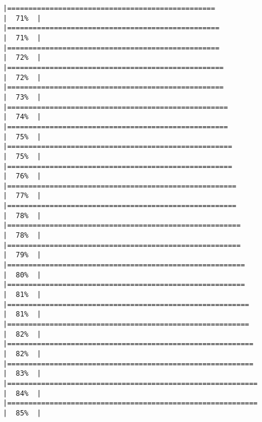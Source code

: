 \documentclass[
]{article}
\begin{document}
\begin{verbatim}
|=================================================                     |  71%  |                                                                              |==================================================                    |  71%  |                                                                              |==================================================                    |  72%  |                                                                              |===================================================                   |  72%  |                                                                              |===================================================                   |  73%  |                                                                              |====================================================                  |  74%  |                                                                              |====================================================                  |  75%  |                                                                              |=====================================================                 |  75%  |                                                                              |=====================================================                 |  76%  |                                                                              |======================================================                |  77%  |                                                                              |======================================================                |  78%  |                                                                              |=======================================================               |  78%  |                                                                              |=======================================================               |  79%  |                                                                              |========================================================              |  80%  |                                                                              |========================================================              |  81%  |                                                                              |=========================================================             |  81%  |                                                                              |=========================================================             |  82%  |                                                                              |==========================================================            |  82%  |                                                                              |==========================================================            |  83%  |                                                                              |===========================================================           |  84%  |                                                                              |===========================================================           |  85%  |                                                                              
\end{verbatim}
\end{document}
